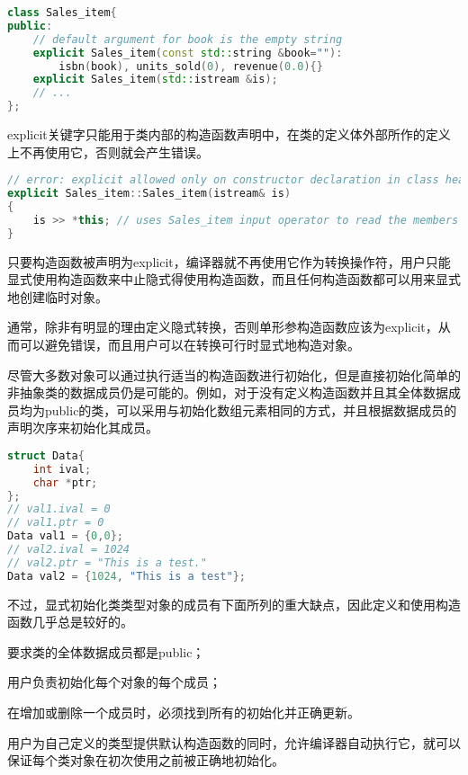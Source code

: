 \begin{lstlisting}[language=C++]
class Sales_item{
public:
	// default argument for book is the empty string
	explicit Sales_item(const std::string &book=""):
		isbn(book), units_sold(0), revenue(0.0){}
	explicit Sales_item(std::istream &is);
	// ...
};
\end{lstlisting}

explicit关键字只能用于类内部的构造函数声明中，在类的定义体外部所作的定义上不再使用它，否则就会产生错误。

\begin{lstlisting}[language=C++]
// error: explicit allowed only on constructor declaration in class header
explicit Sales_item::Sales_item(istream& is)
{
	is >> *this; // uses Sales_item input operator to read the members
}
\end{lstlisting}

只要构造函数被声明为explicit，编译器就不再使用它作为转换操作符，用户只能显式使用构造函数来中止隐式得使用构造函数，而且任何构造函数都可以用来显式地创建临时对象。

通常，除非有明显的理由定义隐式转换，否则单形参构造函数应该为explicit，从而可以避免错误，而且用户可以在转换可行时显式地构造对象。

尽管大多数对象可以通过执行适当的构造函数进行初始化，但是直接初始化简单的非抽象类的数据成员仍是可能的。例如，对于没有定义构造函数并且其全体数据成员均为public的类，可以采用与初始化数组元素相同的方式，并且根据数据成员的声明次序来初始化其成员。

\begin{lstlisting}[language=C++]
struct Data{
	int ival;
	char *ptr;
};
// val1.ival = 0
// val1.ptr = 0
Data val1 = {0,0};
// val2.ival = 1024
// val2.ptr = "This is a test."
Data val2 = {1024, "This is a test"};
\end{lstlisting}

不过，显式初始化类类型对象的成员有下面所列的重大缺点，因此定义和使用构造函数几乎总是较好的。

\begin{compactenum}
\item 要求类的全体数据成员都是public；
\item 用户负责初始化每个对象的每个成员；
\item 在增加或删除一个成员时，必须找到所有的初始化并正确更新。
\end{compactenum}


用户为自己定义的类型提供默认构造函数的同时，允许编译器自动执行它，就可以保证每个类对象在初次使用之前被正确地初始化。






